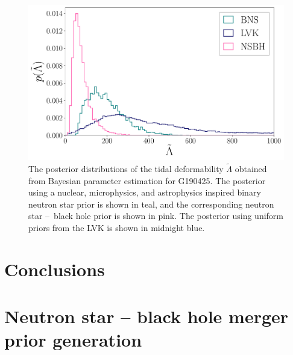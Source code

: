 \documentclass[twocolumn]{aastex631}
\begin{document}
\begin{figure}
    \centering
    \includegraphics[width=1.\linewidth]{Fig_3_GW190425_lambda_tilde_posteriors.pdf}
    \caption{The posterior distributions of the tidal deformability $\tilde{\Lambda}$ obtained from Bayesian parameter estimation for G190425. The posterior using a nuclear, microphysics, and astrophysics inspired binary neutron star prior is shown in teal, and the corresponding neutron star --~black hole prior is shown in pink. 
    The posterior using uniform priors from the LVK is shown in midnight blue. }
    \label{fig:GW190425_tides}
\end{figure}

\section{Conclusions}

\appendix

\section{Neutron star -- black hole merger prior generation}\label{sec:NSBH generation}

\end{document}
